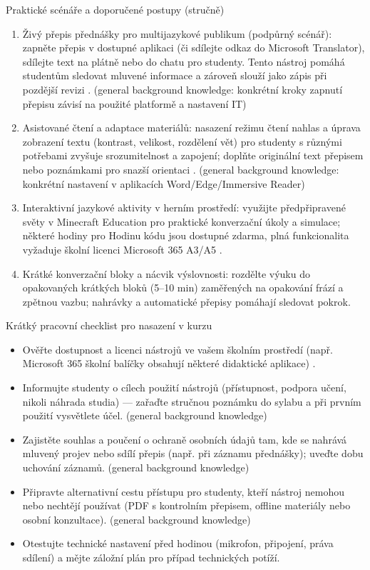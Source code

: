 \documentclass{report}%
\begin{document}
Praktické scénáře a doporučené postupy (stručně)
\begin{enumerate}
  \item Živý přepis přednášky pro multijazykové publikum (podpůrný scénář): zapněte přepis v dostupné aplikaci (či sdílejte odkaz do Microsoft Translator), sdílejte text na plátně nebo do chatu pro studenty. Tento nástroj pomáhá studentům sledovat mluvené informace a zároveň slouží jako zápis při pozdější revizi \cite{kb_ai_101_tipu_pdf_04e4a115_page_11_1}. (general background knowledge: konkrétní kroky zapnutí přepisu závisí na použité platformě a nastavení IT)
  \item Asistované čtení a adaptace materiálů: nasazení režimu čtení nahlas a úprava zobrazení textu (kontrast, velikost, rozdělení vět) pro studenty s různými potřebami zvyšuje srozumitelnost a zapojení; doplňte originální text přepisem nebo poznámkami pro snazší orientaci \cite{kb_ai_101_tipu_pdf_04e4a115_page_11_1}. (general background knowledge: konkrétní nastavení v aplikacích Word/Edge/Immersive Reader)
  \item Interaktivní jazykové aktivity v herním prostředí: využijte předpřipravené světy v Minecraft Education pro praktické konverzační úkoly a simulace; některé hodiny pro Hodinu kódu jsou dostupné zdarma, plná funkcionalita vyžaduje školní licenci Microsoft 365 A3/A5 \cite{kb_ai_101_tipu_pdf_04e4a115_page_15_2}.
  \item Krátké konverzační bloky a nácvik výslovnosti: rozdělte výuku do opakovaných krátkých bloků (5–10 min) zaměřených na opakování frází a zpětnou vazbu; nahrávky a automatické přepisy pomáhají sledovat pokrok.
\end{enumerate}

Krátký pracovní checklist pro nasazení v kurzu
\begin{itemize}
  \item Ověřte dostupnost a licenci nástrojů ve vašem školním prostředí (např. Microsoft 365 školní balíčky obsahují některé didaktické aplikace) \cite{kb_ai_101_tipu_pdf_04e4a115_page_15_2}.
  \item Informujte studenty o cílech použití nástrojů (přístupnost, podpora učení, nikoli náhrada studia) — zařaďte stručnou poznámku do sylabu a při prvním použití vysvětlete účel. (general background knowledge)
  \item Zajistěte souhlas a poučení o ochraně osobních údajů tam, kde se nahrává mluvený projev nebo sdílí přepis (např. při záznamu přednášky); uveďte dobu uchování záznamů. (general background knowledge)
  \item Připravte alternativní cestu přístupu pro studenty, kteří nástroj nemohou nebo nechtějí používat (PDF s kontrolním přepisem, offline materiály nebo osobní konzultace). (general background knowledge)
  \item Otestujte technické nastavení před hodinou (mikrofon, připojení, práva sdílení) a mějte záložní plán pro případ technických potíží.
\end{itemize}
\end{document}
